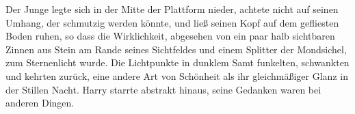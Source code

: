 Der Junge legte sich in der Mitte der Plattform nieder, achtete nicht auf seinen Umhang, der schmutzig werden könnte, und ließ seinen Kopf auf dem gefliesten Boden ruhen, so dass die Wirklichkeit, abgesehen von ein paar halb sichtbaren Zinnen aus Stein am Rande seines Sichtfeldes und einem Splitter der Mondsichel, zum Sternenlicht wurde.
Die Lichtpunkte in dunklem Samt funkelten, schwankten und kehrten zurück, eine andere Art von Schönheit als ihr gleichmäßiger Glanz in der Stillen Nacht.
Harry starrte abstrakt hinaus, seine Gedanken waren bei anderen Dingen.

